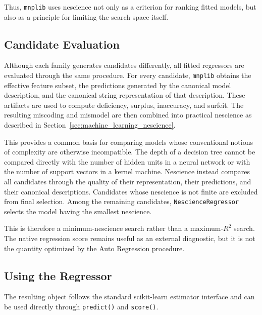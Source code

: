 Thus, \texttt{mnplib} uses nescience not only as a criterion for ranking fitted models, but also as a principle for limiting the search space itself.


\subsection*{Candidate Evaluation}

Although each family generates candidates differently, all fitted regressors are evaluated through the same procedure. For every candidate, \texttt{mnplib} obtains the effective feature subset, the predictions generated by the canonical model description, and the canonical string representation of that description. These artifacts are used to compute deficiency, surplus, inaccuracy, and surfeit. The resulting miscoding and mismodel are then combined into practical nescience as described in Section~\ref{sec:machine_learning_nescience}.

This provides a common basis for comparing models whose conventional notions of complexity are otherwise incompatible. The depth of a decision tree cannot be compared directly with the number of hidden units in a neural network or with the number of support vectors in a kernel machine. Nescience instead compares all candidates through the quality of their representation, their predictions, and their canonical descriptions. Candidates whose nescience is not finite are excluded from final selection.
Among the remaining candidates, \texttt{NescienceRegressor} selects the model having the smallest nescience.

This is therefore a minimum-nescience search rather than a maximum-$R^2$ search. The native regression score remains useful as an external diagnostic, but it is not the quantity optimized by the Auto Regression procedure.


\subsection*{Using the Regressor}

The resulting object follows the standard scikit-learn estimator interface and can be used directly through \texttt{predict()} and \texttt{score()}.


